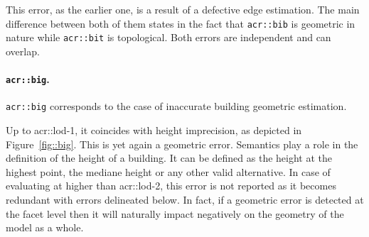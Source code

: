                 This error, as the earlier one, is a result of a defective edge estimation.
                The main difference between both of them states in the fact that \texttt{\gls{acr::bib}} is geometric in nature while \texttt{\gls{acr::bit}} is topological.
                Both errors are independent and can overlap.

            \paragraph{\texttt{\acrlong*{acr::big}}.}
                \texttt{\gls{acr::big}} corresponds to the case of inaccurate building geometric estimation.

                \begin{figure}[htbp]
                    \centering
                \end{figure}

                Up to \gls{acr::lod}-1, it coincides with height imprecision, as depicted in Figure~\ref{fig::big}.
                This is yet again a geometric error.
                Semantics play a role in the definition of the height of a building.
                It can be defined as the height at the highest point, the mediane height or any other valid alternative.
                In case of evaluating at higher than \gls{acr::lod}-2, this error is not reported as it becomes redundant with errors delineated below.
                In fact, if a geometric error is detected at the facet level then it will naturally impact negatively on the geometry of the model as a whole.
            
